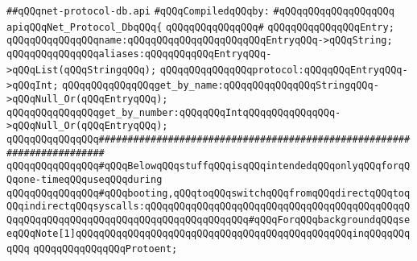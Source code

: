 \label{src/lib/std/src/socket/net-protocol-db.api}
\verb|##qQQqnet-protocol-db.api|\newline
\newline
\verb|#qQQqCompiledqQQqby:|\newline
\verb|#qQQqqQQqqQQqqQQqqQQq|\newline
\newline
\newline
\newline
\verb|apiqQQqNet_Protocol_DbqQQq{|\newline
\verb|qQQqqQQqqQQqqQQq#|\newline
\verb|qQQqqQQqqQQqqQQqEntry;|\newline
\newline
\verb|qQQqqQQqqQQqqQQqname:qQQqqQQqqQQqqQQqqQQqqQQqEntryqQQq->qQQqString;|\newline
\verb|qQQqqQQqqQQqqQQqaliases:qQQqqQQqqQQqEntryqQQq->qQQqList(qQQqStringqQQq);|\newline
\verb|qQQqqQQqqQQqqQQqprotocol:qQQqqQQqEntryqQQq->qQQqInt;|\newline
\newline
\verb|qQQqqQQqqQQqqQQqget_by_name:qQQqqQQqqQQqqQQqStringqQQq->qQQqNull_Or(qQQqEntryqQQq);|\newline
\verb|qQQqqQQqqQQqqQQqget_by_number:qQQqqQQqIntqQQqqQQqqQQqqQQq->qQQqNull_Or(qQQqEntryqQQq);|\newline
\newline
\newline
\verb|qQQqqQQqqQQqqQQq#######################################################################|\newline
\verb|qQQqqQQqqQQqqQQq#qQQqBelowqQQqstuffqQQqisqQQqintendedqQQqonlyqQQqforqQQqone-timeqQQquseqQQqduring|\newline
\verb|qQQqqQQqqQQqqQQq#qQQqbooting,qQQqtoqQQqswitchqQQqfromqQQqdirectqQQqtoqQQqindirectqQQqsyscalls:qQQqqQQqqQQqqQQqqQQqqQQqqQQqqQQqqQQqqQQqqQQqqQQqqQQqqQQqqQQqqQQqqQQqqQQqqQQqqQQqqQQqqQQq#qQQqForqQQqbackgroundqQQqseeqQQqNote[1]qQQqqQQqqQQqqQQqqQQqqQQqqQQqqQQqqQQqqQQqqQQqqQQqinqQQqqQQqqQQq|\newline
\newline
\verb|qQQqqQQqqQQqqQQqProtoent;|\newline
\newline
